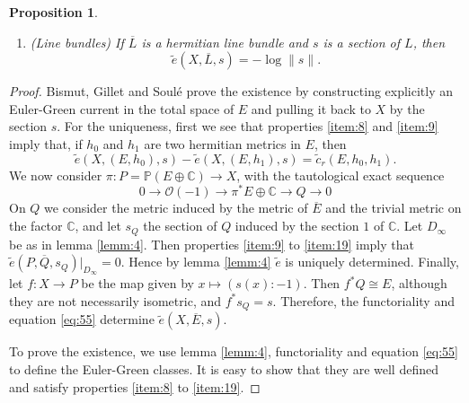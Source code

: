 \documentclass[10pt,twoside]{article}
\numberwithin{equation}{section}
\theoremstyle{plain}
\newtheorem{proposition}[equation]{Proposition}
\theoremstyle{definition}
\begin{document}
\begin{proposition}
\begin{enumerate}
\begin{multline*}
      \delta _{Y_{1}}\land \widetilde e(X,\overline
      E_{2},s_{2})\\
      =\widetilde e(X,\overline
      E_{1},s_{1})\land \delta _{Y_{2}}+
       c_{r_{1}}(\overline E_{1})\land \widetilde e(X,\overline
      E_{2},s_{2}).
    \end{multline*}
  \item \label{item:19} (Line bundles) If $\overline L$ is a hermitian
    line bundle and $s$ is a  
    section of $L$, then
    \begin{equation}
      \label{eq:54}
       \widetilde e(X,\overline L,s)=-\log\|s\|.
    \end{equation}
  \end{enumerate}
\end{proposition}
\begin{proof}
  Bismut, Gillet and Soul\'e prove the existence by constructing explicitly
  an Euler-Green current in the total space of $E$ and pulling it back to $X$
  by the section $s$. For the uniqueness, first we see that properties
  \ref{item:8} and \ref{item:9} imply that, if $h_{0}$ and $h_{1}$ are
  two hermitian metrics in $E$, then
  \begin{equation}
    \label{eq:55}
     \widetilde e(X,(E,h_{0}),s)-\widetilde e(X,(E,h_{1}),s)=
     \widetilde c_{r}(E,h_{0},h_{1}).
  \end{equation}
  We now consider $\pi \colon P=\mathbb{P}(E\oplus
  \mathbb{C})\longrightarrow X$,  with the
  tautological exact sequence
  \begin{equation*}
    0\longrightarrow \mathcal{O}(-1)\longrightarrow \pi ^{\ast}E\oplus
    \mathbb{C} 
    \longrightarrow Q \longrightarrow 0
  \end{equation*}
  On $Q$ we consider the metric induced by the metric of $\overline E$
  and the 
  trivial metric on the factor $\mathbb{C}$, and let $s_{Q}$ the
  section of $Q$ induced by the section $1$ of
  $\mathbb{C}$. Let $D_{\infty}$ be as in lemma \ref{lemm:4}.
  Then properties \ref{item:9} to \ref{item:19} imply that 
  $\widetilde e(P,\overline Q,s_{Q})|_{D_{\infty}}=0$. Hence by lemma
  \ref{lemm:4} $\widetilde e$ is uniquely determined. Finally, let 
  $f\colon X\longrightarrow P$ be the map given by $x\longmapsto
  (s(x):-1)$. Then $f^{\ast}Q\cong E$, although they are not
  necessarily isometric,
  and $f^{\ast}s_{Q}=s$. Therefore, the functoriality and  equation
  \eqref{eq:55} determine $ \widetilde e(X,\overline E,s)$.

  To prove the existence, we use lemma \ref{lemm:4}, functoriality and
  equation \eqref{eq:55} to define the Euler-Green classes. It is easy
  to show that they are well defined and satisfy properties
  \ref{item:8} to \ref{item:19}. 
\end{proof}
\end{document}
